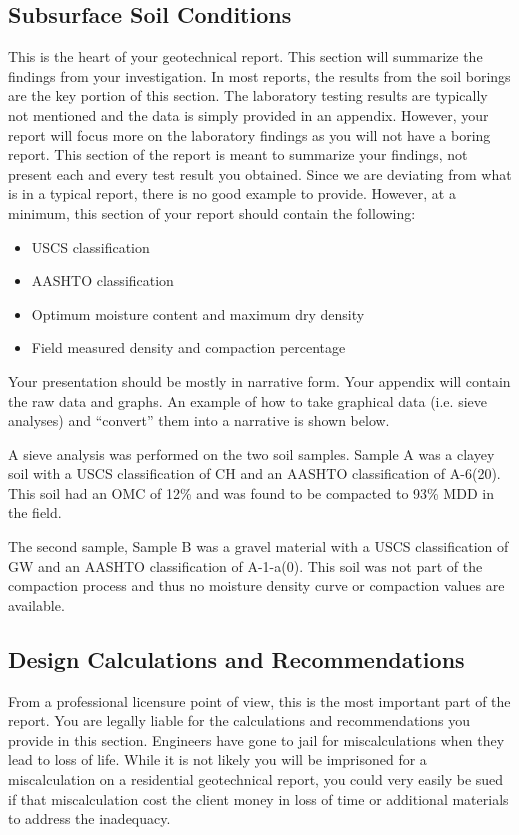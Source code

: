 \documentclass[12pt]{article}
\begin{document}
\pagebreak
\subsection{Subsurface Soil Conditions}
This is the heart of your geotechnical report. This section will summarize the findings from your investigation. In most reports, the results from the soil borings are the key portion of this section. The laboratory testing results are typically not mentioned and the data is simply provided in an appendix. However, your report will focus more on the laboratory findings as you will not have a boring report. This section of the report is meant to summarize your findings, not present each and every test result you obtained. Since we are deviating from what is in a typical report, there is no good example to provide. However, at a minimum, this section of your report should contain the following:
\begin{itemize}
    \item USCS classification
    \item AASHTO classification
    \item Optimum moisture content and maximum dry density
    \item Field measured density and compaction percentage
\end{itemize}

Your presentation should be mostly in narrative form. Your appendix will contain the raw data and graphs. An example of how to take graphical data (i.e. sieve analyses) and ``convert'' them into a narrative is shown below.

\begin{letter}
A sieve analysis was performed on the two soil samples. Sample A was a clayey soil with a USCS classification of CH and an AASHTO classification of A-6(20). This soil had an OMC of 12\% and was found to be compacted to 93\% MDD in the field.

The second sample, Sample B was a gravel material with a USCS classification of GW and an AASHTO classification of A-1-a(0). This soil was not part of the compaction process and thus no moisture density curve or compaction values are available.
\end{letter}

\pagebreak
\subsection{Design Calculations and Recommendations}
From a professional licensure point of view, this is the most important part of the report. You are legally liable for the calculations and recommendations you provide in this section. Engineers have gone to jail for miscalculations when they lead to loss of life. While it is not likely you will be imprisoned for a miscalculation on a residential geotechnical report, you could very easily be sued if that miscalculation cost the client money in loss of time or additional materials to address the inadequacy.
\end{document}
